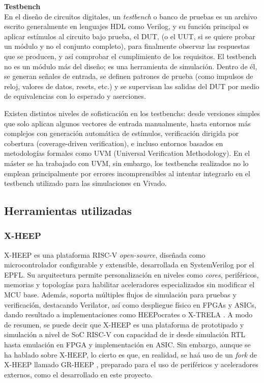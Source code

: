 \begin{adjustwidth}{1.5cm}{}
\textbf{Testbench} \vspace{0.25cm} \\
En el diseño de circuitos digitales, un \emph{testbench} o banco de pruebas es un archivo escrito generalmente en lenguajes HDL como Verilog, y su función principal es aplicar estímulos al circuito bajo prueba, el \ac{DUT}, (o el \ac{UUT}, si se quiere probar un módulo y no el conjunto completo), para finalmente observar las respuestas que se producen, y así comprobar el cumplimiento de los requisitos. El testbench no es un módulo más del diseño; es una herramienta de simulación. Dentro de él, se generan señales de entrada, se definen patrones de prueba (como impulsos de reloj, valores de datos, resets, etc.) y se supervisan las salidas del DUT por medio de equivalencias con lo esperado y aserciones.

Existen distintos niveles de sofisticación en los testbenchs: desde versiones simples que solo aplican algunos vectores de entrada manualmente, hasta entornos más complejos con generación automática de estímulos, verificación dirigida por cobertura (coverage-driven verification), e incluso entornos basados en metodologías formales como UVM (Universal Verification Methodology). En el máster se ha trabajado con UVM, sin embargo, los testbenchs realizados no lo emplean principalmente por errores incomprensibles al intentar integrarlo en el testbench utilizado para las simulaciones en Vivado.
\end{adjustwidth}

\subsection{Herramientas utilizadas}

\subsubsection{X-HEEP}
\label{st:xheep}
\ac{X-HEEP} \cite{machetti2024xheep} \cite{xheepInfo} es una plataforma RISC-V \textit{open-source}, diseñada como microcontrolador configurable y extensible, desarrollada en SystemVerilog por el \ac{EPFL}. Su arquitectura permite personalización en niveles como \textit{cores}, periféricos, memorias y topologías para habilitar aceleradores especializados sin modificar el \ac{MCU} base. Además, soporta múltiples flujos de simulación para pruebas y verificación, destacando Verilator, así como despliegue físico en FPGAs y ASICs, dando resultado a implementaciones como HEEPocrates o X-TRELA \cite{xheepInfoASIC}. A modo de resumen, se puede decir que X-HEEP es una plataforma de prototipado y simulación a nivel de \ac{SoC} RISC-V con capacidad de ir desde simulación RTL hasta emulación en FPGA y implementación en ASIC. Sin embargo, aunque se ha hablado sobre X-HEEP, lo cierto es que, en realidad, se haá uso de un \textit{fork} de X-HEEP llamado GR-HEEP \cite{grheepInfo}, preparado para el uso de periféricos y aceleradores externos, como el desarrollado en este proyecto.


